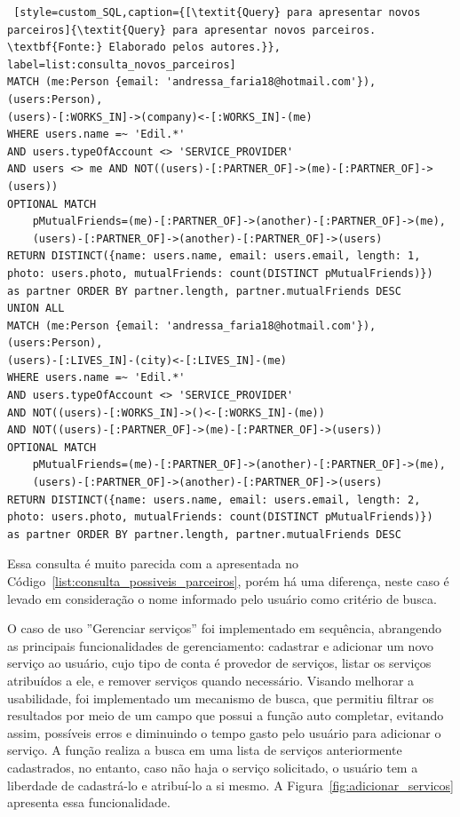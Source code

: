 \begin{lstlisting} [style=custom_SQL,caption={[\textit{Query} para apresentar novos parceiros]{\textit{Query} para apresentar novos parceiros. \textbf{Fonte:} Elaborado pelos autores.}}, label=list:consulta_novos_parceiros] 	
MATCH (me:Person {email: 'andressa_faria18@hotmail.com'}), (users:Person),
(users)-[:WORKS_IN]->(company)<-[:WORKS_IN]-(me)
WHERE users.name =~ 'Edil.*'
AND users.typeOfAccount <> 'SERVICE_PROVIDER'
AND users <> me AND NOT((users)-[:PARTNER_OF]->(me)-[:PARTNER_OF]->(users))  
OPTIONAL MATCH 
	pMutualFriends=(me)-[:PARTNER_OF]->(another)-[:PARTNER_OF]->(me), 
	(users)-[:PARTNER_OF]->(another)-[:PARTNER_OF]->(users) 
RETURN DISTINCT({name: users.name, email: users.email, length: 1, 
photo: users.photo, mutualFriends: count(DISTINCT pMutualFriends)}) 
as partner ORDER BY partner.length, partner.mutualFriends DESC 
UNION ALL 
MATCH (me:Person {email: 'andressa_faria18@hotmail.com'}), (users:Person),
(users)-[:LIVES_IN]-(city)<-[:LIVES_IN]-(me)
WHERE users.name =~ 'Edil.*'
AND users.typeOfAccount <> 'SERVICE_PROVIDER' 
AND NOT((users)-[:WORKS_IN]->()<-[:WORKS_IN]-(me)) 
AND NOT((users)-[:PARTNER_OF]->(me)-[:PARTNER_OF]->(users)) 
OPTIONAL MATCH 
	pMutualFriends=(me)-[:PARTNER_OF]->(another)-[:PARTNER_OF]->(me), 
	(users)-[:PARTNER_OF]->(another)-[:PARTNER_OF]->(users) 
RETURN DISTINCT({name: users.name, email: users.email, length: 2, 
photo: users.photo, mutualFriends: count(DISTINCT pMutualFriends)})
as partner ORDER BY partner.length, partner.mutualFriends DESC
\end{lstlisting}

\par Essa consulta é muito parecida com a apresentada no Código~\ref{list:consulta_possiveis_parceiros}, porém há uma diferença, neste caso é levado em consideração o nome informado pelo usuário como critério de busca.
 

\par O caso de uso ''Gerenciar serviços'' foi implementado em sequência, abrangendo as principais funcionalidades de gerenciamento: cadastrar e adicionar um novo serviço ao usuário, cujo tipo de conta é provedor de serviços, listar os serviços atribuídos a ele, e remover serviços quando necessário. Visando melhorar a usabilidade, foi implementado um mecanismo de busca, que permitiu filtrar os resultados por meio de um campo que possui a função  auto completar, evitando assim, possíveis erros e diminuindo o tempo gasto pelo usuário para adicionar o serviço. A função realiza a busca em uma lista de serviços anteriormente cadastrados, no entanto, caso não haja o serviço solicitado, o usuário tem a liberdade de cadastrá-lo e atribuí-lo a si mesmo. A Figura~\ref{fig:adicionar_servicos} apresenta essa funcionalidade.

